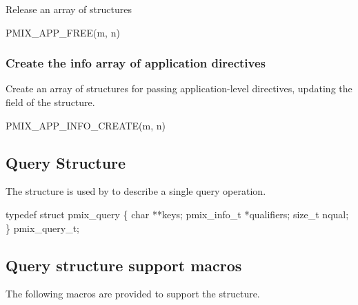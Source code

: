 Release an array of  structures

\cspecificstart
\begin{codepar}
PMIX_APP_FREE(m, n)
\end{codepar}
\cspecificend

\begin{arglist}
\end{arglist}

\subsubsection{Create the info array of application directives}

Create an array of  structures for passing application-level directives, updating the  field of the  structure.

\cspecificstart
\begin{codepar}
PMIX_APP_INFO_CREATE(m, n)
\end{codepar}
\cspecificend

\begin{arglist}
\end{arglist}


\subsection{Query Structure}

The  structure is used by  to describe a single query operation.

\cspecificstart
\begin{codepar}
typedef struct pmix_query \{
    char **keys;
    pmix_info_t *qualifiers;
    size_t nqual;
\} pmix_query_t;
\end{codepar}
\cspecificend

\subsection{Query structure support macros}
The following macros are provided to support the  structure.


